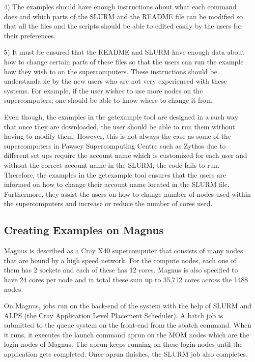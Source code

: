 \documentclass[journal]{IEEEtran}
\begin{document}
4) The examples should have enough instructions about what each command does and which parts of the SLURM and the README file can be modified so that
all the files and the scripts should be able to edited easily by the users for their preferences.

5) It must be ensured that the README and SLURM have enough data about how to change certain parts of these files so that the users can run the 
example how they wish to on the supercomputers. These instructions should be understandable by the new users who are not very experienced with these
systems. For example, if the user wishes to use more nodes on the supercomputers, one should be able to know where to change it from.
 
Even though, the examples in the getexample tool are designed in a such way that once they are downloaded, the user should be able to run them without
having to modify them. However, this is not always the case as some of the supercomputers in Pawsey Supercomputing Centre such as Zythos due to
different set ups require the account name which is customized for each user and without the correct account name in the SLURM, the code fails to run. 
Therefore, the examples in the getexample tool ensures that the users are informed on how to change their account name located in the SLURM file.
Furthermore, they assist the users on how to change number of nodes used within the supercomputers and increase or reduce the number of cores used.     


\subsection{Creating Examples on Magnus}

Magnus is described as a Cray X40 supercomputer that consists of many nodes that are bound by a high speed network. For the compute nodes, each one 
of them has 2 sockets and each of these has 12 cores. Magnus is also specified to have 24 cores per node and in total these sum up to 35,712 cores across 
the 1488 nodes. 

On Magnus, jobs run on the back-end of the system with the help of SLURM and ALPS (the Cray Application Level Placement Scheduler). A 
batch job is submitted to the queue system on the front-end from the sbatch command. When it runs, it executes the launch command aprun on the MOM nodes 
which are the login nodes of Magnus. The aprun keeps running on these login nodes until the application gets completed. Once aprun finishes, the SLURM 
job also completes.
\end{document}
